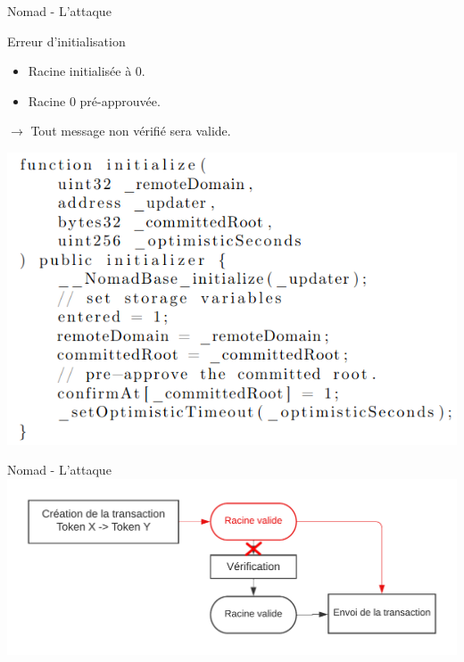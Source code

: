 \begin{frame}{Nomad - L'attaque}
    \begin{block}{Erreur d'initialisation}
        \begin{itemize}
            \item Racine initialisée à $0$.
            \item Racine $0$ pré-approuvée.
        \end{itemize}
        $\rightarrow$ Tout message non vérifié sera valide.
    \end{block}
        \centering
        \includegraphics[scale = 0.35]{centralisation/img/nomad/nomad_code_hack.png}
\end{frame}

\begin{frame}{Nomad - L'attaque}
    \centering
    \includegraphics[scale = 0.9]{centralisation/img/nomad/nomad_hack.png}
\end{frame}

